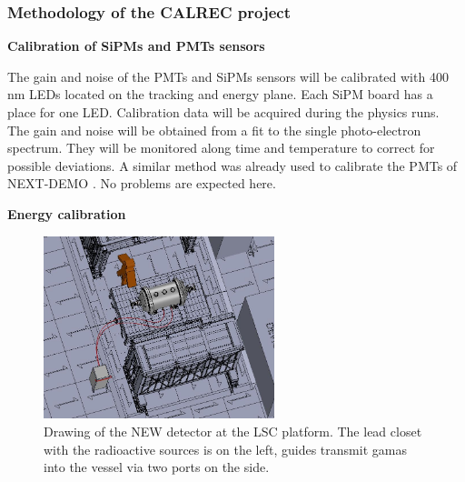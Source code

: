
\subsubsection*{Methodology of the CALREC project}

%

{\bf Calibration of SiPMs and PMTs sensors}

The gain and noise of the PMTs and SiPMs sensors will be calibrated with 400 nm LEDs located on the tracking and energy plane. Each SiPM board has a place for one LED.
Calibration data will be acquired during the physics runs.
The gain and noise will be obtained from a fit to the single photo-electron spectrum.
They will be monitored along time and temperature to correct for possible deviations. 
A similar method was already used to calibrate the PMTs of NEXT-DEMO \cite{NEXT-DEMO}. No problems are expected here.

{\bf Energy calibration}

\begin{figure}
\begin{center}
\includegraphics[width=0.6\textwidth]{img/CALREC_LSC_sources.jpg}
\caption{\small Drawing of the NEW detector at the LSC platform. The lead closet with the radioactive sources is on the left,  guides transmit gamas into the vessel via two ports on the side.}
\label{fig:CALREC_LSC_sources}
\end{center}
\end{figure}

